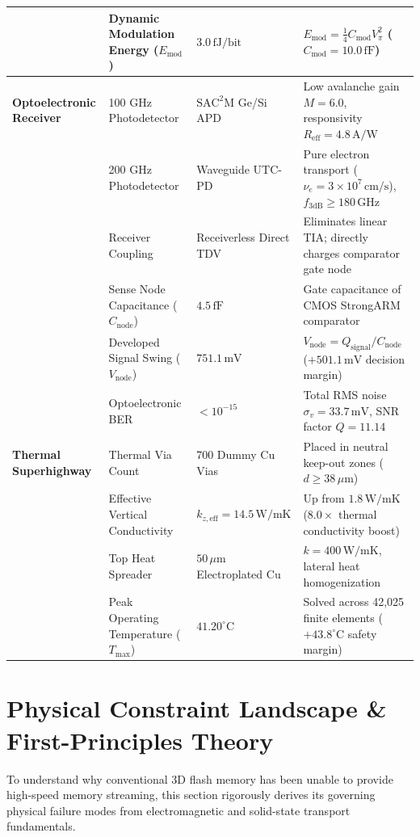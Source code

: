 \documentclass[journal]{IEEEtran}
\begin{document}
\begin{table}[!t]
{\begin{tabular}{llll}
& Dynamic Modulation Energy ($E_{\text{mod}}$) & $3.0\,\text{fJ/bit}$ & $E_{\text{mod}} = \frac{1}{4} C_{\text{mod}} V_\pi^2$ ($C_{\text{mod}} = 10.0\,\text{fF}$) \\
\midrule
\textbf{Optoelectronic Receiver} & 100 GHz Photodetector & $\text{SAC}^2\text{M}$ Ge/Si APD & Low avalanche gain $M = 6.0$, responsivity $R_{\text{eff}} = 4.8\,\text{A/W}$ \\
& 200 GHz Photodetector & Waveguide UTC-PD & Pure electron transport ($\nu_e = 3 \times 10^7\,\text{cm/s}$), $f_{3\text{dB}} \ge 180\,\text{GHz}$ \\
& Receiver Coupling & Receiverless Direct TDV & Eliminates linear TIA; directly charges comparator gate node \\
& Sense Node Capacitance ($C_{\text{node}}$) & $4.5\,\text{fF}$ & Gate capacitance of CMOS StrongARM comparator \\
& Developed Signal Swing ($V_{\text{node}}$) & $751.1\,\text{mV}$ & $V_{\text{node}} = Q_{\text{signal}} / C_{\text{node}}$ ($+501.1\,\text{mV}$ decision margin) \\
& Optoelectronic BER & $< 10^{-15}$ & Total RMS noise $\sigma_v = 33.7\,\text{mV}$, SNR factor $Q = 11.14$ \\
\midrule
\textbf{Thermal Superhighway} & Thermal Via Count & 700 Dummy Cu Vias & Placed in neutral keep-out zones ($d \ge 38\,\mu\text{m}$) \\
& Effective Vertical Conductivity & $k_{z, \text{eff}} = 14.5\,\text{W/mK}$ & Up from $1.8\,\text{W/mK}$ ($8.0\times$ thermal conductivity boost) \\
& Top Heat Spreader & $50\,\mu\text{m}$ Electroplated Cu & $k = 400\,\text{W/mK}$, lateral heat homogenization \\
& Peak Operating Temperature ($T_{\max}$) & $41.20^\circ\text{C}$ & Solved across 42,025 finite elements ($+43.8^\circ\text{C}$ safety margin) \\
\bottomrule
\end{tabular}
}
\end{table}

\section{Physical Constraint Landscape \& First-Principles Theory}
\label{sec:constraints}

To understand why conventional 3D flash memory has been unable to provide high-speed memory streaming, this section rigorously derives its governing physical failure modes from electromagnetic and solid-state transport fundamentals.
\end{document}
